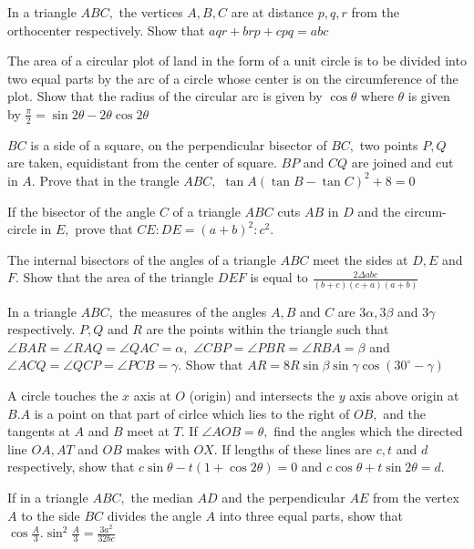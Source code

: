 \item In a triangle $ABC,$ the vertices $A, B, C$ are at distance $p, q, r$ from the orthocenter
     respectively. Show that $aqr + brp + cpq = abc$

\item The area of a circular plot of land in the form of a unit circle is to be divided into two equal parts by the arc of a circle
     whose center is on the circumference of the plot. Show that the radius of the circular arc is given by $\cos\theta$
     where $\theta$ is given by $\frac{\pi}{2} = \sin2\theta - 2\theta\cos2\theta$

\item $BC$ is a side of a square, on the perpendicular bisector of $BC,$ two points $P, Q$ are taken, equidistant
     from the center of square. $BP$ and $CQ$ are joined and cut in $A.$ Prove that in the trangle $ABC,$
     $\tan A(\tan B - \tan C)^2 + 8 = 0$

\item If the bisector of the angle $C$ of a triangle $ABC$ cuts $AB$ in $D$ and the circum-circle in
     $E,$ prove that $CE:DE = (a + b)^2:c^2.$

\item The internal bisectors of the angles of a triangle $ABC$ meet the sides at $D, E$ and $F.$ Show that the
     area of the triangle $DEF$ is equal to $\frac{2\Delta abc}{(b + c)(c + a)(a + b)}$

\item In a triangle $ABC,$ the measures of the angles $A, B$ and $C$ are $3\alpha, 3\beta$ and
     $3\gamma$ respectively. $P, Q$ and $R$ are the points within the triangle such that $\angle BAR =
     \angle RAQ = \angle QAC = \alpha,$ $\angle CBP = \angle PBR = \angle RBA = \beta$ and $\angle ACQ = \angle QCP =
     \angle PCB = \gamma.$ Show that $AR = 8R\sin\beta\sin\gamma\cos(30^\circ - \gamma)$

\item A circle touches the $x$ axis at $O$ (origin) and intersects the $y$ axis above origin at $B. A$ is a
     point on that part of cirlce which lies to the  right of $OB,$ and the tangents at $A$ and $B$ meet at
     $T.$ If $\angle AOB = \theta,$ find the angles which the directed line $OA, AT$ and $OB$ makes with
     $OX.$ If lengths of these lines are $c, t$ and $d$ respectively, show that $c\sin\theta - t(1 +
     \cos2\theta) = 0$ and $c\cos\theta + t\sin2\theta = d.$

\item If in a triangle $ABC,$ the median $AD$ and the perpendicular $AE$ from the vertex $A$ to the side
     $BC$ divides the angle $A$ into three equal parts, show that $\cos\frac{A}{3}.\sin^2\frac{A}{3} =
     \frac{3a^2}{32bc}$

